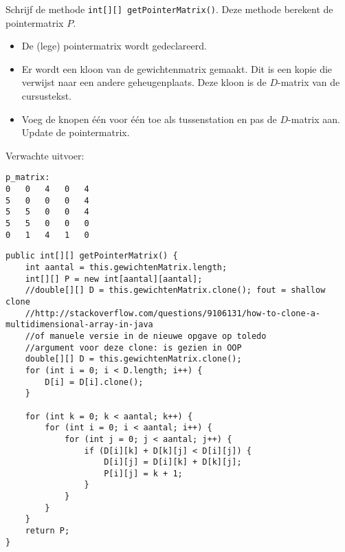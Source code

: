 \begin{oef}
\code Schrijf de methode \verb/int[][] getPointerMatrix()/. Deze methode berekent de pointermatrix $P$.
\begin{itemize}
\item De (lege) pointermatrix wordt gedeclareerd.
\item Er wordt een kloon van de gewichtenmatrix gemaakt. Dit is een kopie die verwijst naar een andere geheugenplaats. Deze kloon is de $D$-matrix van de cursustekst.
\item Voeg de knopen één voor één toe als tussenstation en pas de $D$-matrix aan. Update de pointermatrix.
\end{itemize}

Verwachte uitvoer:
\begin{verbatim}
p_matrix: 
0	0	4	0	4	
5	0	0	0	4	
5	5	0	0	4	
5	5	0	0	0	
0	1	4	1	0
\end{verbatim}
\begin{opl}
\begin{lstlisting}[caption={getPointerMatrix}, label=FloydgetPointerMatrix]
public int[][] getPointerMatrix() {
	int aantal = this.gewichtenMatrix.length;
	int[][] P = new int[aantal][aantal];
	//double[][] D = this.gewichtenMatrix.clone(); fout = shallow clone
	//http://stackoverflow.com/questions/9106131/how-to-clone-a-multidimensional-array-in-java
	//of manuele versie in de nieuwe opgave op toledo
	//argument voor deze clone: is gezien in OOP
	double[][] D = this.gewichtenMatrix.clone();
	for (int i = 0; i < D.length; i++) {
	    D[i] = D[i].clone();
	}

	for (int k = 0; k < aantal; k++) {
		for (int i = 0; i < aantal; i++) {
			for (int j = 0; j < aantal; j++) {
				if (D[i][k] + D[k][j] < D[i][j]) {
					D[i][j] = D[i][k] + D[k][j];
					P[i][j] = k + 1;
				}
			}
		}
	}
	return P;
}
\end{lstlisting}
\end{opl}
\end{oef}





